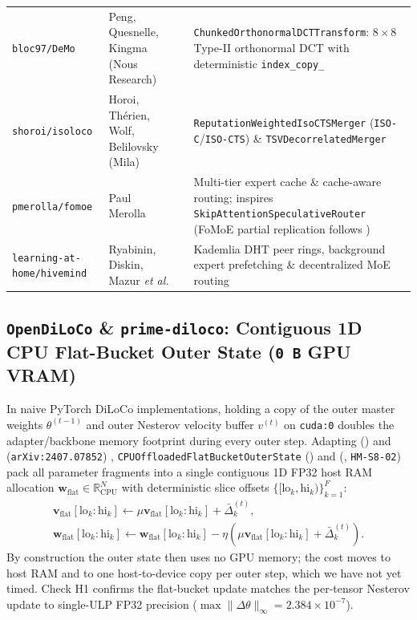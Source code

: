 \documentclass[11pt,a4paper]{article}
\begin{document}
\begin{table}[htbp!]
{\begin{tabular}{@{}lllp{5.8cm}@{}}
\texttt{bloc97/DeMo} & Peng, Quesnelle, Kingma (Nous Research) & \cite{peng2024demo} & \texttt{ChunkedOrthonormalDCTTransform}: $8 \times 8$ Type-II orthonormal DCT with deterministic \texttt{index\_copy\_} \\
\texttt{shoroi/isoloco} & Horoi, Th\'erien, Wolf, Belilovsky (Mila) & \cite{horoi2026isoloco,marczak2025iso} & \texttt{ReputationWeightedIsoCTSMerger} (\texttt{ISO-C}/\texttt{ISO-CTS}) \& \texttt{TSVDecorrelatedMerger} \\
\texttt{pmerolla/fomoe} & Paul Merolla & \cite{merolla2025fomoe} & Multi-tier expert cache \& cache-aware routing; inspires \texttt{SkipAttentionSpeculativeRouter} (FoMoE partial replication follows \cite{sani2026fomoe}) \\
\texttt{learning-at-home/hivemind} & Ryabinin, Diskin, Mazur \textit{et al.} & \cite{ryabinin2020hivemind,borzunov2023petals} & Kademlia DHT peer rings, background expert prefetching \& decentralized MoE routing \\
\bottomrule
\end{tabular}%
}
\end{table}

\subsection{\texttt{OpenDiLoCo} \& \texttt{prime-diloco}: Contiguous 1D CPU Flat-Bucket Outer State (\texttt{0\,B} GPU VRAM)}

In naive PyTorch DiLoCo implementations, holding a copy of the outer master weights $\theta^{(t-1)}$ and outer Nesterov velocity buffer $v^{(t)}$ on \texttt{cuda:0} doubles the adapter/backbone memory footprint during every outer step. Adapting  () and  (\texttt{arXiv:2407.07852}) \cite{jaghouar2024opendiloco}, \texttt{CPUOffloadedFlatBucketOuterState} () and  (, \texttt{HM-S8-02}) pack all parameter fragments into a single contiguous 1D FP32 host RAM allocation $\mathbf{w}_{\text{flat}} \in \mathbb{R}^N_{\text{CPU}}$ with deterministic slice offsets $\{[\text{lo}_k, \text{hi}_k)\}_{k=1}^F$:
\begin{gather}
    \mathbf{v}_{\text{flat}}[\text{lo}_k:\text{hi}_k] \leftarrow \mu \mathbf{v}_{\text{flat}}[\text{lo}_k:\text{hi}_k] + \bar{\Delta}_k^{(t)}, \nonumber\\
    \mathbf{w}_{\text{flat}}[\text{lo}_k:\text{hi}_k] \leftarrow \mathbf{w}_{\text{flat}}[\text{lo}_k:\text{hi}_k] - \eta \left(\mu \mathbf{v}_{\text{flat}}[\text{lo}_k:\text{hi}_k] + \bar{\Delta}_k^{(t)}\right).
\end{gather}
By construction the outer state then uses no GPU memory; the cost moves to host RAM and to one host-to-device copy per outer step, which we have not yet timed. Check H1 confirms the flat-bucket update matches the per-tensor Nesterov update to single-ULP FP32 precision ($\max \|\Delta \theta\|_\infty = 2.384 \times 10^{-7}$).
\end{document}
